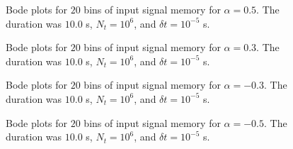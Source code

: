 \begin{figure}
\caption{Bode plots for $20$ bins of input signal memory for $\alpha=0.5$. The duration was $10.0$ s, $N_t=10^6$, and $\delta t = 10^{-5}$ s.}
\label{fig:bode20p05}
\end{figure}

\begin{figure}

\caption{Bode plots for $20$ bins of input signal memory for $\alpha=0.3$. The duration was $10.0$ s, $N_t=10^6$, and $\delta t = 10^{-5}$ s. }
\label{fig:bode20p03}
\end{figure}

\begin{figure}

\caption{Bode plots for $20$ bins of input signal memory for $\alpha=-0.3$. The duration was $10.0$ s, $N_t=10^6$, and $\delta t = 10^{-5}$ s. }
\label{fig:bode20m03}
\end{figure}

\begin{figure}
\caption{Bode plots for $20$ bins of input signal memory for $\alpha=-0.5$. The duration was $10.0$ s, $N_t=10^6$, and $\delta t = 10^{-5}$ s. }
\label{fig:bode20m05}
\end{figure}